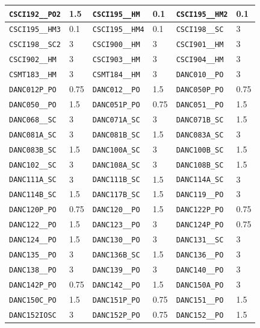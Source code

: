 \begin{longtable}{|l|l||l|l||l|l|}
    \verb|CSCI192__PO2| & 1.5 & \verb|CSCI195__HM| & 0.1 & \verb|CSCI195__HM2| & 0.1\\\hline
    \verb|CSCI195__HM3| & 0.1 & \verb|CSCI195__HM4| & 0.1 & \verb|CSCI198__SC| & 3\\\hline
    \verb|CSCI198__SC2| & 3 & \verb|CSCI900__HM| & 3 & \verb|CSCI901__HM| & 3\\\hline
    \verb|CSCI902__HM| & 3 & \verb|CSCI903__HM| & 3 & \verb|CSCI904__HM| & 3\\\hline
    \verb|CSMT183__HM| & 3 & \verb|CSMT184__HM| & 3 & \verb|DANC010__PO| & 3\\\hline
    \verb|DANC012P_PO| & 0.75 & \verb|DANC012__PO| & 1.5 & \verb|DANC050P_PO| & 0.75\\\hline
    \verb|DANC050__PO| & 1.5 & \verb|DANC051P_PO| & 0.75 & \verb|DANC051__PO| & 1.5\\\hline
    \verb|DANC068__SC| & 3 & \verb|DANC071A_SC| & 3 & \verb|DANC071B_SC| & 1.5\\\hline
    \verb|DANC081A_SC| & 3 & \verb|DANC081B_SC| & 1.5 & \verb|DANC083A_SC| & 3\\\hline
    \verb|DANC083B_SC| & 1.5 & \verb|DANC100A_SC| & 3 & \verb|DANC100B_SC| & 1.5\\\hline
    \verb|DANC102__SC| & 3 & \verb|DANC108A_SC| & 3 & \verb|DANC108B_SC| & 1.5\\\hline
    \verb|DANC111A_SC| & 3 & \verb|DANC111B_SC| & 1.5 & \verb|DANC114A_SC| & 3\\\hline
    \verb|DANC114B_SC| & 1.5 & \verb|DANC117B_SC| & 1.5 & \verb|DANC119__PO| & 3\\\hline
    \verb|DANC120P_PO| & 0.75 & \verb|DANC120__PO| & 1.5 & \verb|DANC122P_PO| & 0.75\\\hline
    \verb|DANC122__PO| & 1.5 & \verb|DANC123__PO| & 3 & \verb|DANC124P_PO| & 0.75\\\hline
    \verb|DANC124__PO| & 1.5 & \verb|DANC130__PO| & 3 & \verb|DANC131__SC| & 3\\\hline
    \verb|DANC135__PO| & 3 & \verb|DANC136B_SC| & 1.5 & \verb|DANC136__PO| & 3\\\hline
    \verb|DANC138__PO| & 3 & \verb|DANC139__PO| & 3 & \verb|DANC140__PO| & 3\\\hline
    \verb|DANC142P_PO| & 0.75 & \verb|DANC142__PO| & 1.5 & \verb|DANC150A_PO| & 3\\\hline
    \verb|DANC150C_PO| & 1.5 & \verb|DANC151P_PO| & 0.75 & \verb|DANC151__PO| & 1.5\\\hline
    \verb|DANC152IOSC| & 3 & \verb|DANC152P_PO| & 0.75 & \verb|DANC152__PO| & 1.5\\\hline

\end{longtable}
